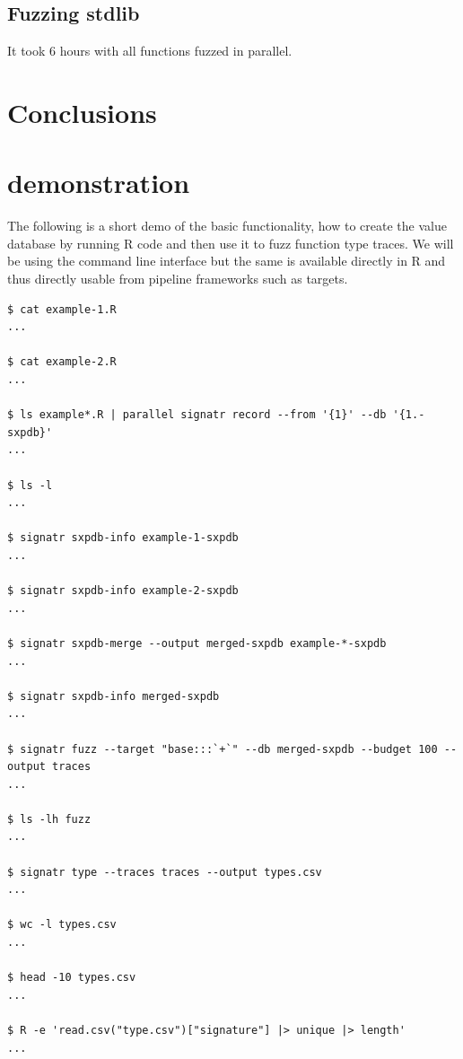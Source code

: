 \documentclass[sigplan,anonymous,review]{acmart}
\begin{document}
\subsection{Fuzzing stdlib}

%
It took 6 hours with all functions fuzzed in parallel.



\section{Conclusions}
\label{sec:conclusions}




\appendix

\section{\tool demonstration}\label{sec:demo}

The following is a short demo of the basic \tool functionality, \Ie how to create the value database by running R code and then use it to fuzz function type traces.
We will be using the command line interface but the same is available directly in R and thus directly usable from pipeline frameworks such as targets.


\begin{lstlisting}
$ cat example-1.R
...

$ cat example-2.R
...

$ ls example*.R | parallel signatr record --from '{1}' --db '{1.-sxpdb}'
...

$ ls -l
...

$ signatr sxpdb-info example-1-sxpdb
...

$ signatr sxpdb-info example-2-sxpdb
...

$ signatr sxpdb-merge --output merged-sxpdb example-*-sxpdb
...

$ signatr sxpdb-info merged-sxpdb
...

$ signatr fuzz --target "base:::`+`" --db merged-sxpdb --budget 100 --output traces
...

$ ls -lh fuzz
...

$ signatr type --traces traces --output types.csv
...

$ wc -l types.csv
...

$ head -10 types.csv
...

$ R -e 'read.csv("type.csv")["signature"] |> unique |> length'
...

\end{lstlisting}
\end{document}
